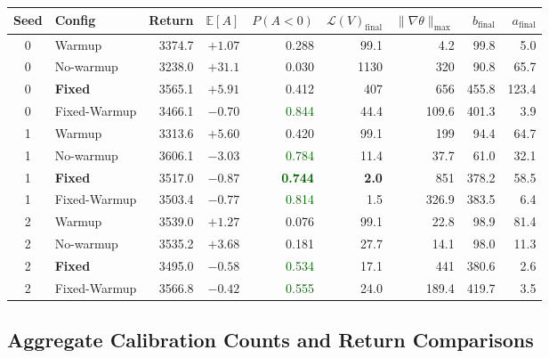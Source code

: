 \documentclass[10pt,a4paper]{article}
\begin{document}
\begin{center}
\setlength{\tabcolsep}{4.5pt}
\begin{tabular}{clrrrrrrr}
\toprule
\textbf{Seed} & \textbf{Config} & \textbf{Return} & $\mathbb{E}[A]$
  & $P(A{<}0)$ & $\mathcal{L}(V)_\text{final}$
  & $\|\nabla\theta\|_\text{max}$ & $b_\text{final}$ & $a_\text{final}$ \\
\midrule
0 & Warmup       & 3374.7 & $+1.07$ & 0.288 &  99.1 &   4.2 &  99.8 &   5.0 \\
0 & No-warmup    & 3238.0 & $+31.1$ & 0.030 & 1130  & 320   &  90.8 &  65.7 \\
0 & \textbf{Fixed}        & 3565.1 & $+5.91$ & 0.412 & 407 & 656 & 455.8 & 123.4 \\
0 & Fixed-Warmup & 3466.1 & $-0.70$ & \textcolor{darkgreen}{0.844} & 44.4 & 109.6 & 401.3 & 3.9 \\
\midrule
1 & Warmup       & 3313.6 & $+5.60$ & 0.420 &  99.1 & 199   &  94.4 &  64.7 \\
1 & No-warmup    & 3606.1 & $-3.03$ & \textcolor{darkgreen}{0.784} &  11.4 &  37.7 &  61.0 &  32.1 \\
1 & \textbf{Fixed}        & 3517.0 & $-0.87$ & \textcolor{darkgreen}{\textbf{0.744}} & \textbf{2.0} & 851 & 378.2 & 58.5 \\
1 & Fixed-Warmup & 3503.4 & $-0.77$ & \textcolor{darkgreen}{0.814} & 1.5 & 326.9 & 383.5 & 6.4 \\
\midrule
2 & Warmup       & 3539.0 & $+1.27$ & 0.076 &  99.1 &  22.8 &  98.9 &  81.4 \\
2 & No-warmup    & 3535.2 & $+3.68$ & 0.181 &  27.7 &  14.1 &  98.0 &  11.3 \\
2 & \textbf{Fixed}        & 3495.0 & $-0.58$ & \textcolor{darkgreen}{0.534} & 17.1 & 441 & 380.6 &   2.6 \\
2 & Fixed-Warmup & 3566.8 & $-0.42$ & \textcolor{darkgreen}{0.555} & 24.0 & 189.4 & 419.7 & 3.5 \\
\bottomrule
\end{tabular}
\end{center}

\subsection{Aggregate Calibration Counts and Return Comparisons}
\end{document}
